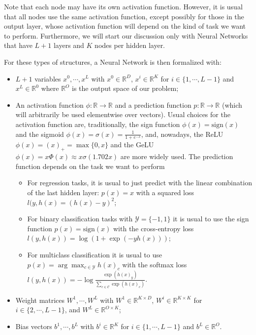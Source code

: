 \documentclass{article}
\newcommand{\R}{\mathbb{R}}
\begin{document}
Note that each node may have its own activation function. 
However, it is usual that all nodes use the same activation function, except possibly for those in the output layer, whose activation function will depend on the kind of task we want to perform.
Furthermore, we will start our discussion only with Neural Networks that have $L+1$ layers and $K$ nodes per hidden layer.

For these types of structures, a Neural Network is then formalized with:
\begin{itemize}
    \item $L+1$ variables $x^0, \cdots, x^L$ with $x^0 \in \R^D$, $x^i \in \R^K$ for $i \in \{1, \cdots, L-1\}$ and $x^L \in \R^0$ where $\R^O$ is the output space of our problem;
    \item An activation function $\phi : \R \to \R$ and a prediction function $p : \R \to \R$ (which will arbitrarily be used elementwise over vectors).
	Usual choices for the activation function are, traditionally, the sign function $\phi(x) = \text{sign}(x)$ and the sigmoid $\phi(x) = \sigma(x) = \frac{1}{1+e^{-x}}$, and, nowadays, the ReLU $\phi(x) = (x)_+ = \max\{0,x\}$ and the GeLU $\phi(x) = x \Phi(x) \approx x \sigma(1.702x)$ are more widely used.
	The prediction function depends on the task we want to perform
	\begin{itemize}
	    \item For regression tasks, it is usual to just predict with the linear combination of the last hidden layer: 
		$p(x) = x$ 
		with a squared loss 
		$l(y, h(x) = (h(x) - y)^2$;
	    \item For binary classification tasks with $\mathcal{Y} = \{-1, 1\}$ it is usual to use the sign function 
		$p(x) = \text{sign}(x)$
		with the cross-entropy loss
		$l(y, h(x)) = \log(1 + \exp(-yh(x)))$;
	    \item For multiclass classification it is usual to use 
		$p(x) = \arg \max_{c \in \mathcal{Y}} h(x)_c$
		with the softmax loss
		$l(y, h(x)) = -\log \frac{\exp(h(x)_y)}{\sum_{c \in \mathcal{C}} \exp(h(x)_c)}$.
	\end{itemize}
    \item Weight matrices $W^1, \cdots, W^L$ with $W^1 \in \R^{K \times D}$, $W^i \in \R^{K \times K}$ for $i \in \{2, \cdots, L-1\}$, and $W^L \in \R^{O \times K}$;
    \item Bias vectors $b^1, \cdots, b^L$ with $b^i \in \R^K$ for $i \in \{1, \cdots, L-1\}$ and $b^L \in \R^O$.
\end{itemize}
\end{document}
